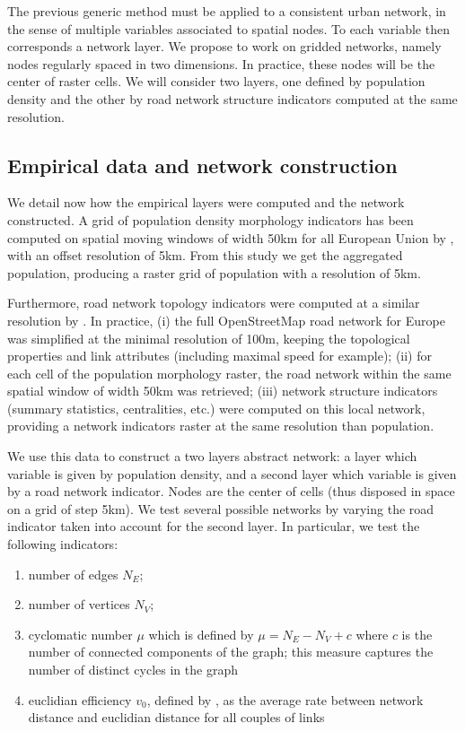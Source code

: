 \documentclass{jimis-en}
\begin{document}
The previous generic method must be applied to a consistent urban network, in the sense of multiple variables associated to spatial nodes. To each variable then corresponds a network layer. We propose to work on gridded networks, namely nodes regularly spaced in two dimensions. In practice, these nodes will be the center of raster cells. We will consider two layers, one defined by population density and the other by road network structure indicators computed at the same resolution.



\subsection{Empirical data and network construction}


We detail now how the empirical layers were computed and the network constructed. A grid of population density morphology indicators has been computed on spatial moving windows of width 50km for all European Union by \cite{raimbault2018calibration}, with an offset resolution of 5km. From this study we get the aggregated population, producing a raster grid of population with a resolution of 5km.

Furthermore, road network topology indicators were computed at a similar resolution by \cite{raimbault2018urban}. In practice, (i) the full OpenStreetMap road network for Europe was simplified at the minimal resolution of 100m, keeping the topological properties and link attributes (including maximal speed for example); (ii) for each cell of the population morphology raster, the road network within the same spatial window of width 50km was retrieved; (iii) network structure indicators (summary statistics, centralities, etc.) were computed on this local network, providing a network indicators raster at the same resolution than population.

We use this data to construct a two layers abstract network: a layer which variable is given by population density, and a second layer which variable is given by a road network indicator. Nodes are the center of cells (thus disposed in space on a grid of step 5km). We test several possible networks by varying the road indicator taken into account for the second layer. In particular, we test the following indicators:
\begin{enumerate}
	\item number of edges $N_E$;
	\item number of vertices $N_V$;
	\item cyclomatic number $\mu$ which is defined by $\mu = N_E - N_V + c$ where $c$ is the number of connected components of the graph; this measure captures the number of distinct cycles in the graph
	\item euclidian efficiency $v_0$, defined by \cite{banos2012towards}, as the average rate between network distance and euclidian distance for all couples of links
\end{enumerate}
\end{document}
